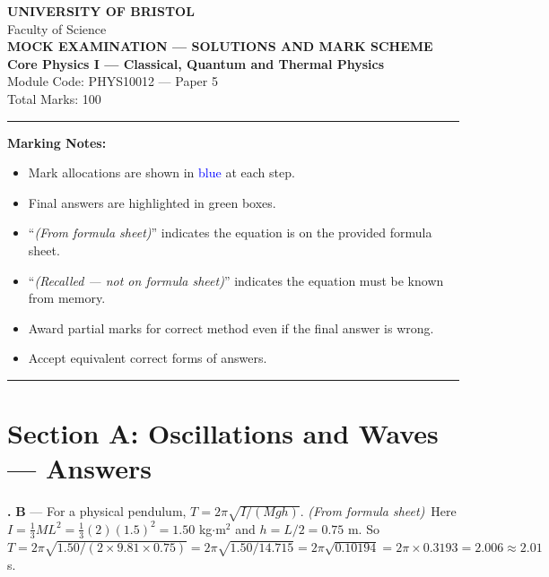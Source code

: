 \documentclass[12pt,a4paper]{article}
\newcommand{\fromsheet}{\textit{(From formula sheet)}}
\newcommand{\recalled}{\textit{(Recalled --- not on formula sheet)}}
\newcounter{mcqcounter}
\newcommand{\mcqanswer}[2]{%
  \stepcounter{mcqcounter}%
  \noindent\textbf{\themcqcounter.} \textbf{#1} --- #2\\[0.2cm]%
}
\begin{document}
\begin{center}
{\Large\textbf{UNIVERSITY OF BRISTOL}}\\[0.3cm]
{\large Faculty of Science}\\[0.5cm]
{\Large\textbf{MOCK EXAMINATION --- SOLUTIONS AND MARK SCHEME}}\\[0.3cm]
{\large\textbf{Core Physics I --- Classical, Quantum and Thermal Physics}}\\[0.2cm]
{\large Module Code: PHYS10012 --- Paper 5}\\[0.5cm]
{\large Total Marks: 100}\\[0.3cm]
\end{center}

\noindent\rule{\textwidth}{0.4pt}

\vspace{0.3cm}
\noindent\textbf{Marking Notes:}
\begin{itemize}[itemsep=0.1cm]
\item Mark allocations are shown in \textcolor{blue}{blue} at each step.
\item Final answers are highlighted in green boxes.
\item ``\fromsheet'' indicates the equation is on the provided formula sheet.
\item ``\recalled'' indicates the equation must be known from memory.
\item Award partial marks for correct method even if the final answer is wrong.
\item Accept equivalent correct forms of answers.
\end{itemize}

\noindent\rule{\textwidth}{0.4pt}
\newpage

\section*{Section A: Oscillations and Waves --- Answers}

\setcounter{mcqcounter}{0}

\mcqanswer{B}{For a physical pendulum, $T = 2\pi\sqrt{I/(Mgh)}$. \fromsheet\ Here $I = \frac{1}{3}ML^2 = \frac{1}{3}(2)(1.5)^2 = 1.50$ kg$\cdot$m$^2$ and $h = L/2 = 0.75$ m. So $T = 2\pi\sqrt{1.50/(2\times 9.81\times 0.75)} = 2\pi\sqrt{1.50/14.715} = 2\pi\sqrt{0.10194} = 2\pi\times 0.3193 = 2.006 \approx 2.01$ s.}
\end{document}

